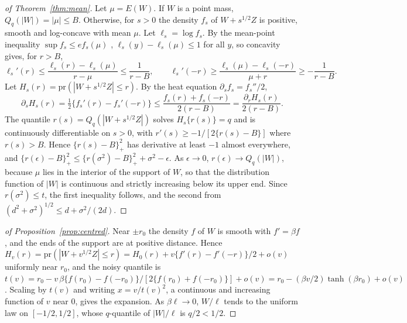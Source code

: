 \documentclass[lineno]{biometrika}
\newcommand{\pr}{\mathrm{pr}}
\begin{document}
\begin{proof}[of Theorem~\ref{thm:mean}]
Let $\mu = E(W)$. If $W$ is a point mass, $Q_q(|W|) = |\mu| \le B$. Otherwise, for $s > 0$ the density $f_s$ of $W + s^{1/2}Z$ is positive, smooth and log-concave with mean $\mu$. Let $\ell_s = \log f_s$. By the mean-point inequality $\sup f_s \le e f_s(\mu)$ \citep[][Corollary~4.6]{fradelizi1997, fradelizi2016}, $\ell_s(y) - \ell_s(\mu) \le 1$ for all $y$, so concavity gives, for $r > B$,
\[
\ell_s'(r) \le \frac{\ell_s(r) - \ell_s(\mu)}{r - \mu} \le \frac{1}{r - B}, \qquad \ell_s'(-r) \ge \frac{\ell_s(\mu) - \ell_s(-r)}{\mu + r} \ge -\frac{1}{r - B}.
\]
Let $H_s(r) = \pr(|W + s^{1/2}Z| \le r)$. By the heat equation $\partial_s f_s = f_s''/2$,
\[
\partial_s H_s(r) = \tfrac12\{f_s'(r) - f_s'(-r)\} \le \frac{f_s(r) + f_s(-r)}{2(r - B)} = \frac{\partial_r H_s(r)}{2(r - B)}.
\]
The quantile $r(s) = Q_q(|W + s^{1/2}Z|)$ solves $H_s\{r(s)\} = q$ and is continuously differentiable on $s > 0$, with $r'(s) \ge -1/[2\{r(s) - B\}]$ where $r(s) > B$. Hence $\{r(s) - B\}_+^2$ has derivative at least $-1$ almost everywhere, and $\{r(\epsilon) - B\}_+^2 \le \{r(\sigma^2) - B\}_+^2 + \sigma^2 - \epsilon$. As $\epsilon \to 0$, $r(\epsilon) \to Q_q(|W|)$, because $\mu$ lies in the interior of the support of $W$, so that the distribution function of $|W|$ is continuous and strictly increasing below its upper end. Since $r(\sigma^2) \le t$, the first inequality follows, and the second from $(d^2 + \sigma^2)^{1/2} \le d + \sigma^2/(2d)$.
\end{proof}

\begin{proof}[of Proposition~\ref{prop:centred}]
Near $\pm r_0$ the density $f$ of $W$ is smooth with $f' = \beta f$, and the ends of the support are at positive distance. Hence $H_v(r) = \pr(|W + v^{1/2}Z| \le r) = H_0(r) + v\{f'(r) - f'(-r)\}/2 + o(v)$ uniformly near $r_0$, and the noisy quantile is $t(v) = r_0 - v\,\beta\{f(r_0) - f(-r_0)\}/[2\{f(r_0) + f(-r_0)\}] + o(v) = r_0 - (\beta v/2)\tanh(\beta r_0) + o(v)$. Scaling by $t(v)$ and writing $x = v/t(v)^2$, a continuous and increasing function of $v$ near $0$, gives the expansion. As $\beta\ell \to 0$, $W/\ell$ tends to the uniform law on $[-1/2, 1/2]$, whose $q$-quantile of $|W|/\ell$ is $q/2 < 1/2$.
\end{proof}
\end{document}
